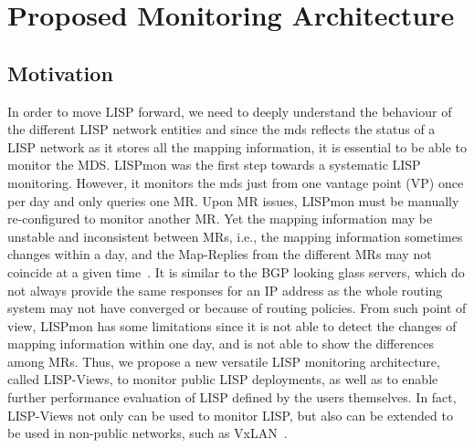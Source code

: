\section{Proposed Monitoring Architecture}
\label{sec:lispviews_archi}

\subsection{Motivation}
\label{sec:lispviews_archi_motivation}

In order to move LISP forward, we need to deeply understand the behaviour of the different LISP network entities and since the \acrshort{mds} reflects the status of a LISP network as it stores all the mapping information, it is essential to be able to monitor the MDS. LISPmon was the first step towards a systematic LISP monitoring. However, it monitors the \acrshort{mds} just from one vantage point (VP) once per day and only queries one MR. Upon MR issues, LISPmon must be manually re-configured to  monitor another MR. Yet the mapping information may be unstable and inconsistent between MRs, i.e., the mapping information sometimes changes within a day, and the Map-Replies from the different MRs may not coincide at a given time~\cite{yue2016stability}. It is similar to the BGP looking glass servers, which do not always provide the same responses for an IP address as the whole routing system may not have converged or because of routing policies. From such point of view, LISPmon has some limitations since it is not able to detect the changes of mapping information within one day, and is not able to show the differences among MRs. Thus, we propose a new versatile LISP monitoring architecture, called LISP-Views, to monitor public LISP deployments, as well as to enable further performance evaluation of LISP defined by the users themselves. In fact, LISP-Views not only can be used to monitor LISP, but also can be extended to be used in non-public networks, such as VxLAN~\cite{mahalingam2014virtual}.

